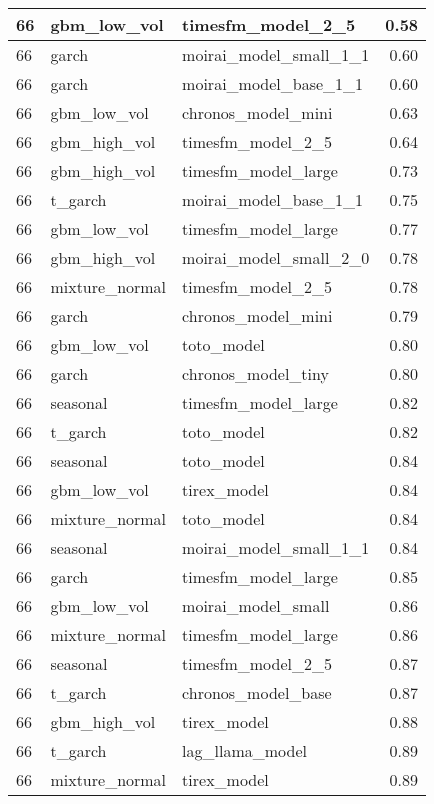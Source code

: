 {\begin{tabular}{lllr}
\midrule
66 & gbm\_low\_vol & timesfm\_model\_2\_5 & 0.58 \\
\midrule
66 & garch & moirai\_model\_small\_1\_1 & 0.60 \\
\midrule
66 & garch & moirai\_model\_base\_1\_1 & 0.60 \\
\midrule
66 & gbm\_low\_vol & chronos\_model\_mini & 0.63 \\
\midrule
66 & gbm\_high\_vol & timesfm\_model\_2\_5 & 0.64 \\
\midrule
66 & gbm\_high\_vol & timesfm\_model\_large & 0.73 \\
\midrule
66 & t\_garch & moirai\_model\_base\_1\_1 & 0.75 \\
\midrule
66 & gbm\_low\_vol & timesfm\_model\_large & 0.77 \\
\midrule
66 & gbm\_high\_vol & moirai\_model\_small\_2\_0 & 0.78 \\
\midrule
66 & mixture\_normal & timesfm\_model\_2\_5 & 0.78 \\
\midrule
66 & garch & chronos\_model\_mini & 0.79 \\
\midrule
66 & gbm\_low\_vol & toto\_model & 0.80 \\
\midrule
66 & garch & chronos\_model\_tiny & 0.80 \\
\midrule
66 & seasonal & timesfm\_model\_large & 0.82 \\
\midrule
66 & t\_garch & toto\_model & 0.82 \\
\midrule
66 & seasonal & toto\_model & 0.84 \\
\midrule
66 & gbm\_low\_vol & tirex\_model & 0.84 \\
\midrule
66 & mixture\_normal & toto\_model & 0.84 \\
\midrule
66 & seasonal & moirai\_model\_small\_1\_1 & 0.84 \\
\midrule
66 & garch & timesfm\_model\_large & 0.85 \\
\midrule
66 & gbm\_low\_vol & moirai\_model\_small & 0.86 \\
\midrule
66 & mixture\_normal & timesfm\_model\_large & 0.86 \\
\midrule
66 & seasonal & timesfm\_model\_2\_5 & 0.87 \\
\midrule
66 & t\_garch & chronos\_model\_base & 0.87 \\
\midrule
66 & gbm\_high\_vol & tirex\_model & 0.88 \\
\midrule
66 & t\_garch & lag\_llama\_model & 0.89 \\
\midrule
66 & mixture\_normal & tirex\_model & 0.89 \\

\end{tabular}}

